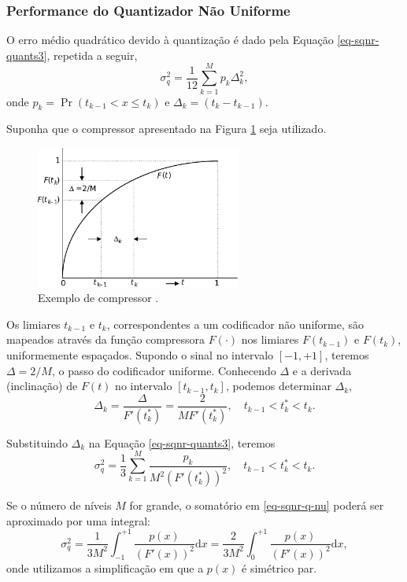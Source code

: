 \begin{frame}[allowframebreaks]
  \frametitle{Performance do Quantizador Não Uniforme}

  O erro médio quadrático devido à quantização é dado pela Equação \ref{eq-sqnr-quants3}, repetida a seguir,
  \begin{equation} 
  \sigma_q^2 = \frac{1}{12} \sum_{k=1}^{M} p_k \Delta_k^2  , \nonumber
  \end{equation}
  onde $p_k = \Pr(t_{k-1} < x \leq t_k)$ e $\Delta_k = (t_k - t_{k-1})$.

  Suponha que o compressor apresentado na Figura \ref{fig:excompressor} seja utilizado.
  \begin{figure}[h!]
  \centering
  \includegraphics[width=0.6\textwidth]{images/excompressor.pdf}
  \caption{Exemplo de compressor \citep{tokunbo}.}
  \label{fig:excompressor}
  \end{figure}

  Os limiares $t_{k-1}$ e $t_{k}$, correspondentes a um codificador não uniforme, são mapeados 
  através da função compressora $F(\cdot)$ nos limiares $F(t_{k-1})$ e $F(t_k)$, uniformemente espaçados.
  Supondo o sinal no intervalo $[-1,+1]$, teremos $\Delta = 2/M$, o passo do codificador uniforme.
  Conhecendo $\Delta$ e a derivada (inclinação) de $F(t)$ no intervalo $[t_{k-1},t_{k}]$, podemos 
  determinar $\Delta_k$,
  \begin{equation}\label{eq-dk-F}
  \Delta_k = \frac{\Delta}{F'(t_k^{\ast})} = \frac{2}{M F'(t_k^{\ast})}, \quad t_{k-1} < t_k^\ast < t_k .
  \end{equation} 

  Substituindo $\Delta_k$ na Equação \ref{eq-sqnr-quants3}, teremos
  \begin{equation} \label{eq-sqnr-q-nu}
  \sigma_q^2 = \frac{1}{3} \sum_{k=1}^{M} \frac{p_k}{M^2 (F'(t_k^{\ast}))^2} , \quad t_{k-1} < t_k^\ast < t_k .
  \end{equation}

  Se o número de níveis $M$ for grande, o somatório em \ref{eq-sqnr-q-nu} poderá ser aproximado por
  uma integral:
  \begin{equation} \label{eq-sqnr-q-nu2}
  \sigma_q^2 = \frac{1}{3M^2} \int_{-1}^{+1} \frac{p(x)}{ (F'(x))^2 } \mathrm{d}x = \frac{2}{3M^2} \int_{0}^{+1} \frac{p(x)}{ (F'(x))^2 } \mathrm{d}x  ,
  \end{equation}
  onde utilizamos a simplificação em que a $p(x)$ é simétrico par.


\end{frame}

